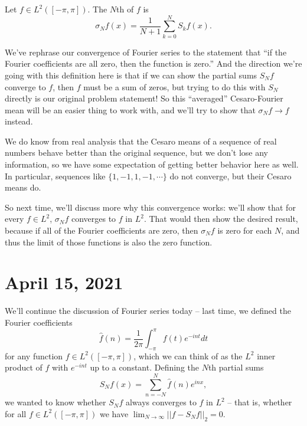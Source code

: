 \begin{definition}
Let $f \in L^2([-\pi, \pi])$. The $N$th  of $f$ is 
\[
    \sigma_Nf(x) = \frac{1}{N+1} \sum_{k=0}^N S_kf(x).
\]
\end{definition}

We've rephrase our convergence of Fourier series to the statement that ``if the Fourier coefficients are all zero, then the function is zero.'' And the direction we're going with this definition here is that if we can show the partial sums $S_Nf$ converge to $f$, then $f$ must be a sum of zeros, but trying to do this with $S_N$ directly is our original problem statement! So this ``averaged'' Cesaro-Fourier mean will be an easier thing to work with, and we'll try to show that $\sigma_Nf \to f$ instead. 

\begin{remark}
We do know from real analysis that the Cesaro means of a sequence of real numbers behave better than the original sequence, but we don't lose any information, so we have some expectation of getting better behavior here as well. In particular, sequences like $\{1, -1, 1, -1, \cdots\}$ do not converge, but their Cesaro means do.
\end{remark}

So next time, we'll discuss more why this convergence works: we'll show that for every $f \in L^2$, $\sigma_N f$ converges to $f$ in $L^2$. That would then show the desired result, because if all of the Fourier coefficients are zero, then $\sigma_N f$ is zero for each $N$, and thus the limit of those functions is also the zero function.


\pagebreak\section*{April 15, 2021}

We'll continue the discussion of Fourier series today -- last time, we defined the Fourier coefficients 
\[
    \hat{f}(n) = \frac{1}{2\pi} \int_{-\pi}^{\pi} f(t) e^{-int} dt
\]
for any function $f \in L^2([-\pi, \pi])$, which we can think of as the $L^2$ inner product of $f$ with $e^{-int}$ up to a constant. Defining the $N$th partial sums
\[
    S_Nf(x) = \sum_{n=-N}^N \hat{f}(n) e^{inx},
\]
we wanted to know whether $S_Nf$ always converges to $f$ in $L^2$ -- that is, whether for all $f \in L^2([-\pi, \pi])$ we have $\lim_{N \to \infty} ||f - S_N f||_2 = 0$.

